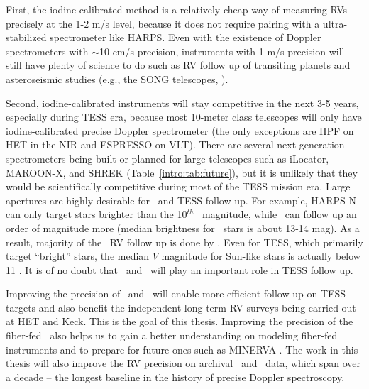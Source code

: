 First, the iodine-calibrated method is a relatively cheap way of
measuring RVs precisely at the 1-2 m/s level, because it does not
require pairing with a ultra-stabilized spectrometer like HARPS. Even
with the existence of Doppler spectrometers with $\sim$10 cm/s
precision, instruments with 1 m/s precision will still have plenty of
science to do such as RV follow up of transiting planets and
asteroseismic studies (e.g., the SONG telescopes,
\citealt{2011JPhCS.271a2083G}).  

Second, iodine-calibrated instruments will stay competitive in the
next 3-5 years, especially during TESS era, because most 10-meter
class telescopes will only have iodine-calibrated precise Doppler
spectrometer (the only exceptions are HPF on HET in the NIR and
ESPRESSO on VLT). There are several next-generation spectrometers
being built or planned for large telescopes such as iLocator,
MAROON-X, and SHREK (Table~\ref{intro:tab:future}), but it is unlikely
that they would be scientifically competitive during most of the TESS
mission era. Large apertures are highly desirable for \kepler\ and
TESS follow up. For example, HARPS-N can only target stars brighter
than the 10$^{th}$ \kepler\ magnitude, while \keck\ can follow up an
order of magnitude more (median brightness for \kepler\ stars is about
13-14 mag). As a result, majority of the \kepler\ RV follow up is done
by \keck. Even for TESS, which primarily target ``bright'' stars, the
median $V$ magnitude for Sun-like stars is actually below 11
\citep{sullivan2015}. It is of no doubt that \het\ and \keck\ will
play an important role in TESS follow up.

Improving the precision of \het\ and \keck\ will enable more efficient
follow up on TESS targets and also benefit the independent long-term
RV surveys being carried out at HET and Keck. This is the goal of this
thesis. Improving the precision of the fiber-fed \het\ also helps us
to gain a better understanding on modeling fiber-fed instruments and
to prepare for future ones such as MINERVA \citep{minerva}. The work
in this thesis will also improve the RV precision on archival \het\
and \keck\ data, which span over a decade -- the longest baseline in
the history of precise Doppler spectroscopy. 

